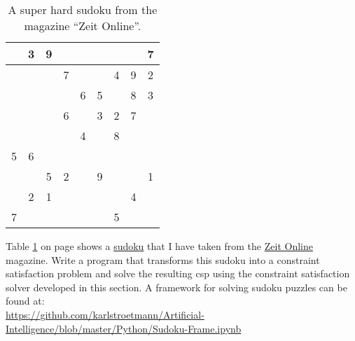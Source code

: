 \begin{table}[h]
  \centering
  \begin{tabular}{||c|c|c||c|c|c||c|c|c||}
    \hline
    \hline
      & 3 & 9 &   &   &   &   &   & 7 \\
    \hline
      &   &   & 7 &   &   & 4 & 9 & 2 \\
    \hline
      &   &   &   & 6 & 5 &   & 8 & 3 \\
    \hline
    \hline
      &   &   & 6 &   & 3 & 2 & 7 &   \\
    \hline
      &   &   &   & 4 &   & 8 &   &   \\
    \hline
    5 & 6 &   &   &   &   &   &   &   \\
    \hline
    \hline
      &   & 5 & 2 &   & 9 &   &   & 1 \\
    \hline
      & 2 & 1 &   &   &   &   & 4 &   \\
    \hline
    7 &   &   &   &   &   & 5 &   &   \\
    \hline
    \hline
  \end{tabular}
  \caption{A super hard sudoku from the magazine ``Zeit Online''.}
  \label{tab:sudoku}
\end{table}

\exercise
{}
Table \ref{tab:sudoku} on page \pageref{tab:sudoku} shows a \href{https://en.wikipedia.org/wiki/Sudoku}{sudoku}
that I have taken from the
\href{http://sudoku.zeit.de/cgi-bin/sudoku/sudoku_kd_app_2016.pl?action=level&kd_nr=24091123601092&year=2018&month=03&day=23&level=-c+5}{Zeit Online}
magazine.  Write a program that transforms this sudoku into a constraint satisfaction problem and solve the
resulting \ac{csp} using the constraint satisfaction solver developed in this section.  A framework for solving sudoku
puzzles can be found at:
\\[0.2cm]
\href{https://github.com/karlstroetmann/Artificial-Intelligence/blob/master/Python/Sudoku-Frame.ipynb}{https://github.com/karlstroetmann/Artificial-Intelligence/blob/master/Python/Sudoku-Frame.ipynb}


